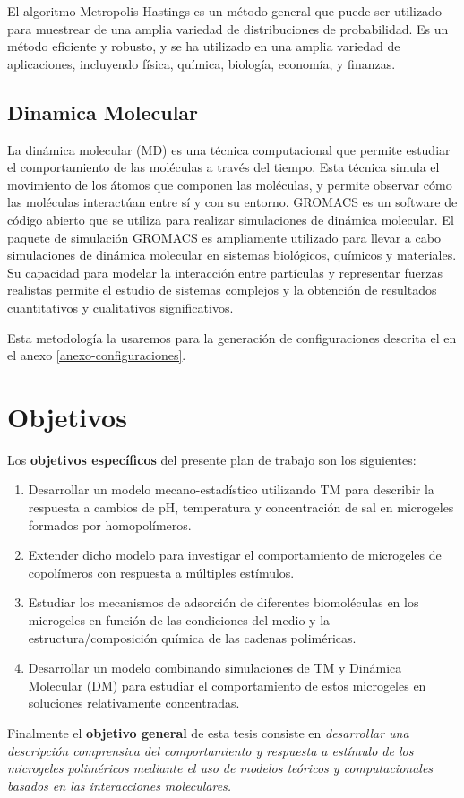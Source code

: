 El algoritmo Metropolis-Hastings es un m\'etodo general que puede ser utilizado para muestrear de una amplia variedad de distribuciones de probabilidad. Es un m\'etodo eficiente y robusto, y se ha utilizado en una amplia variedad de aplicaciones, incluyendo f\'isica, qu\'imica, biolog\'ia, econom\'ia, y finanzas.\cite{sin2020applications}

\subsection{Dinamica Molecular}

La din\'amica molecular (MD) es una t\'ecnica computacional que permite estudiar el comportamiento de las mol\'eculas a trav\'es del tiempo. Esta t\'ecnica simula el movimiento de los \'atomos que componen las mol\'eculas, y permite observar c\'omo las mol\'eculas interact\'uan entre s\'i y con su entorno.
GROMACS es un software de c\'odigo abierto que se utiliza para realizar simulaciones de din\'amica molecular. \cite{lindahl2001gromacs}
El paquete de simulaci\'on GROMACS es ampliamente utilizado para llevar a cabo simulaciones de din\'amica molecular en sistemas biol\'ogicos, qu\'imicos y materiales. Su capacidad para modelar la interacci\'on entre part\'iculas y representar fuerzas realistas permite el estudio de sistemas complejos y la obtenci\'on de resultados cuantitativos y cualitativos significativos.

Esta metodolog\'ia la usaremos para la generaci\'on de configuraciones descrita el en el anexo \ref{anexo-configuraciones}.






\section{Objetivos}

Los {\bf objetivos específicos} del presente plan de trabajo son los siguientes:
%
\begin{enumerate}
\item Desarrollar un modelo mecano-estadístico utilizando TM para describir la respuesta a cambios de pH, temperatura y concentración de sal en microgeles formados por homopolímeros.%
\item Extender dicho modelo para investigar el comportamiento de microgeles de copolímeros con respuesta a múltiples estímulos.%
\item Estudiar los mecanismos de adsorción de diferentes biomoléculas en los microgeles en función de las condiciones del medio y la estructura/composición química de las cadenas poliméricas.%
\item Desarrollar un modelo combinando simulaciones de TM y Dinámica Molecular (DM) para estudiar el comportamiento de estos microgeles en soluciones relativamente concentradas.%
\end{enumerate}
%

Finalmente el \textbf{objetivo general} de esta tesis consiste en \emph{desarrollar una descripción comprensiva del comportamiento y respuesta a estímulo de los microgeles poliméricos mediante el uso de modelos teóricos y computacionales basados en las interacciones moleculares.}
